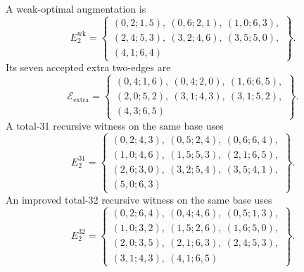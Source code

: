 A weak-optimal augmentation is
\[
E_2^{\mathrm{wk}}=\left\{\begin{gathered}
(0,2;1,5),\ (0,6;2,1),\ (1,0;6,3),\\
(2,4;5,3),\ (3,2;4,6),\ (3,5;5,0),\\
(4,1;6,4)
\end{gathered}\right\}.
\]
Its seven accepted extra two-edges are
\[
\mathcal E_{\mathrm{extra}}=\left\{\begin{gathered}
(0,4;1,6),\ (0,4;2,0),\ (1,6;6,5),\\
(2,0;5,2),\ (3,1;4,3),\ (3,1;5,2),\\
(4,3;6,5)
\end{gathered}\right\}.
\]
A total-31 recursive witness on the same base uses
\[
E_2^{31}=\left\{\begin{gathered}
(0,2;4,3),\ (0,5;2,4),\ (0,6;6,4),\\
(1,0;4,6),\ (1,5;5,3),\ (2,1;6,5),\\
(2,6;3,0),\ (3,2;5,4),\ (3,5;4,1),\\
(5,0;6,3)
\end{gathered}\right\}.
\]
An improved total-32 recursive witness on the same base uses
\[
E_2^{32}=\left\{\begin{gathered}
(0,2;6,4),\ (0,4;4,6),\ (0,5;1,3),\\
(1,0;3,2),\ (1,5;2,6),\ (1,6;5,0),\\
(2,0;3,5),\ (2,1;6,3),\ (2,4;5,3),\\
(3,1;4,3),\ (4,1;6,5)
\end{gathered}\right\}.
\]
